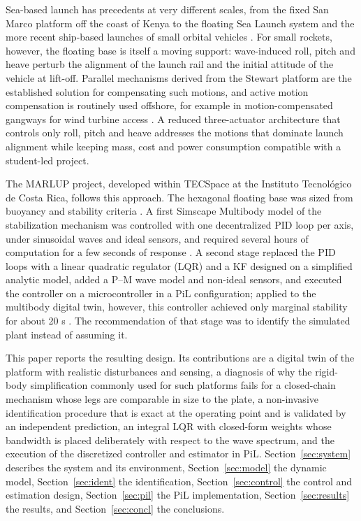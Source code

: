 \documentclass[]{IAC_style}
\begin{document}
Sea-based launch has precedents at very different scales, from the fixed San Marco platform off the coast of Kenya to the floating Sea Launch system and the more recent ship-based launches of small orbital vehicles \cite{sanmarco,sealaunch}. For small rockets, however, the floating base is itself a moving support: wave-induced roll, pitch and heave perturb the alignment of the launch rail and the initial attitude of the vehicle at lift-off. Parallel mechanisms derived from the Stewart platform \cite{stewart1965,dasgupta2000,merlet2006} are the established solution for compensating such motions, and active motion compensation is routinely used offshore, for example in motion-compensated gangways for wind turbine access \cite{cerda2010}. A reduced three-actuator architecture that controls only roll, pitch and heave addresses the motions that dominate launch alignment while keeping mass, cost and power consumption compatible with a student-led project.

The MARLUP project, developed within TECSpace at the Instituto Tecnol\'ogico de Costa Rica, follows this approach. The hexagonal floating base was sized from buoyancy and stability criteria \cite{perez2025flot}. A first Simscape Multibody model of the stabilization mechanism was controlled with one decentralized PID loop per axis, under sinusoidal waves and ideal sensors, and required several hours of computation for a few seconds of response \cite{gonzalez2025}. A second stage replaced the PID loops with a linear quadratic regulator (LQR) and a KF designed on a simplified analytic model, added a P--M wave model and non-ideal sensors, and executed the controller on a microcontroller in a PiL configuration; applied to the multibody digital twin, however, this controller achieved only marginal stability for about 20 s \cite{perez2025stage2}. The recommendation of that stage was to identify the simulated plant instead of assuming it.

This paper reports the resulting design. Its contributions are a digital twin of the platform with realistic disturbances and sensing, a diagnosis of why the rigid-body simplification commonly used for such platforms fails for a closed-chain mechanism whose legs are comparable in size to the plate, a non-invasive identification procedure that is exact at the operating point and is validated by an independent prediction, an integral LQR with closed-form weights whose bandwidth is placed deliberately with respect to the wave spectrum, and the execution of the discretized controller and estimator in PiL. Section~\ref{sec:system} describes the system and its environment, Section~\ref{sec:model} the dynamic model, Section~\ref{sec:ident} the identification, Section~\ref{sec:control} the control and estimation design, Section~\ref{sec:pil} the PiL implementation, Section~\ref{sec:results} the results, and Section~\ref{sec:concl} the conclusions.
\end{document}
